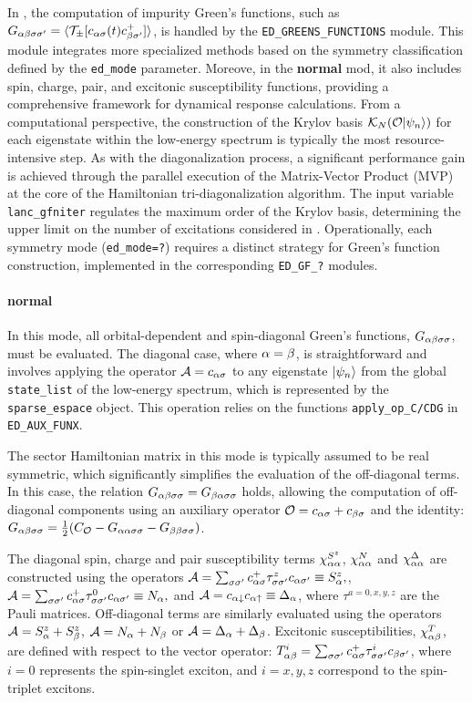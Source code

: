\documentclass[edipack2.tex]{subfiles}
\begin{document}
In \NAME, the computation of impurity Green's functions, such as
$G_{\alpha\beta\sigma\sigma'}=\langle {\cal T}_\pm[ c_{\alpha\sigma}(t) c_{\beta\sigma'}^+ ]\rangle$,
is handled by the \texttt{ED\_GREENS\_FUNCTIONS} module.
This
module integrates more specialized methods based on the symmetry
classification defined by the \texttt{ed\_mode} parameter.
Moreove, in the {\bf normal} mod, it also includes spin, charge, pair, and excitonic
susceptibility functions, providing a comprehensive framework for
dynamical response calculations.
From a computational perspective, the construction of the Krylov basis
$\mathcal{K}_N({\cal O}|\psi_n\rangle)$ for each eigenstate within the low-energy
spectrum is typically the most resource-intensive step.
As with the
diagonalization process, a significant performance gain is achieved through
the parallel execution of the Matrix-Vector Product (MVP) at the core of
the Hamiltonian tri-diagonalization algorithm.
The input variable
\texttt{lanc\_gfniter} regulates the maximum order of the Krylov basis,
determining the upper limit on the number of excitations considered in
.
Operationally, each symmetry mode (\texttt{ed\_mode=?}) requires a distinct
strategy for Green's function construction, implemented in the corresponding
\texttt{ED\_GF\_?} modules.


\paragraph{{\bf normal}}
In this mode, all orbital-dependent and spin-diagonal Green's 
functions, $G_{\alpha\beta\sigma\sigma}$, must be evaluated. The diagonal 
case, where $\alpha=\beta$, is straightforward and involves applying 
the operator ${\cal A}=c_{\alpha\sigma}$ to any eigenstate $|\psi_n\rangle$ 
from the global {\tt state\_list} of the low-energy spectrum, 
which is represented by the {\tt sparse\_espace} object. This 
operation relies on the functions {\tt apply\_op\_C/CDG} in 
{\tt ED\_AUX\_FUNX}. 



The sector Hamiltonian matrix in this mode is typically assumed 
to be real symmetric, which significantly simplifies the evaluation 
of the off-diagonal terms. In this case, the relation 
$G_{\alpha\beta\sigma\sigma}=G_{\beta\alpha\sigma\sigma}$ holds, allowing the computation of 
off-diagonal components using an auxiliary operator 
${\cal O} = c_{\alpha\sigma} + c_{\beta\sigma}$ and the identity:
$G_{\alpha\beta\sigma\sigma}=\tfrac{1}{2}(C_{\cal O} - G_{\alpha\alpha\sigma\sigma} - G_{\beta\beta\sigma\sigma})$.

The diagonal spin, charge and pair susceptibility terms
$\chi^{S^z}_{\alpha\alpha}$, $\chi^N_{\alpha\alpha}$ and $\chi^\Delta_{\alpha\alpha}$
are constructed using the operators ${\cal A} = \sum_{\sigma\sigma'} c^+_{\alpha\sigma}
\tau^z_{\sigma\sigma'} c_{\alpha\sigma'} \equiv S^z_\alpha, $, 
${\cal A} = \sum_{\sigma\sigma'} c^+_{\alpha\sigma} \tau^0_{\sigma\sigma'} c_{\alpha\sigma'} \equiv N_\alpha, $
and ${\cal A} = c_{\alpha\downarrow}c_{\alpha\uparrow} \equiv \Delta_\alpha$,
where $\tau^{a=0,x,y,z}$ are the Pauli matrices.
Off-diagonal terms are similarly evaluated using the operators
${\cal A}=S^z_\alpha + S^z_\beta$, ${\cal A}=N_\alpha + N_\beta$ or ${\cal A}=\Delta_\alpha + \Delta_\beta$. 
Excitonic susceptibilities, $\chi^T_{\alpha\beta}$, are defined with 
respect to the vector operator: $T^i_{\alpha\beta} = \sum_{\sigma\sigma'}
c^+_{\alpha\sigma}\tau^i_{\sigma\sigma'}c_{\beta\sigma'}$, where $i=0$ represents the
spin-singlet exciton, and $i=x,y,z$  correspond to the spin-triplet excitons.
\end{document}

